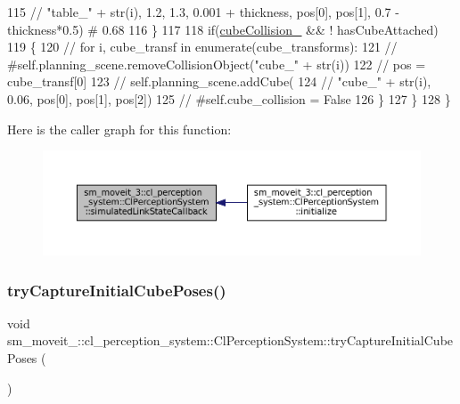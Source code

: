 \begin{DoxyCode}
115         \textcolor{comment}{//                 "table\_" + str(i), 1.2, 1.3, 0.001 + thickness, pos[0],  pos[1],  0.7 - 
       thickness*0.5)  # 0.68}
116         \}
117 
118         \textcolor{keywordflow}{if}(\hyperlink{classsm__moveit__3_1_1cl__perception__system_1_1ClPerceptionSystem_a939dd657fa6c5e05ee171b2ec7daad1f}{cubeCollision\_} && ! hasCubeAttached)
119         \{
120         \textcolor{comment}{//         for i, cube\_transf in enumerate(cube\_transforms):}
121         \textcolor{comment}{//             #self.planning\_scene.removeCollisionObject("cube\_" + str(i))}
122         \textcolor{comment}{//             pos = cube\_transf[0]}
123         \textcolor{comment}{//             self.planning\_scene.addCube(}
124         \textcolor{comment}{//                 "cube\_" + str(i), 0.06, pos[0],  pos[1],  pos[2])}
125         \textcolor{comment}{//             #self.cube\_collision = False}
126         \}
127       \}
128   \}
\end{DoxyCode}
Here is the caller graph for this function\+:
\nopagebreak
\begin{figure}[H]
\begin{center}
\leavevmode
\includegraphics[width=350pt]{classsm__moveit__3_1_1cl__perception__system_1_1ClPerceptionSystem_a540c3a50c29e6ec58f6fcd7e993d9dff_icgraph}
\end{center}
\end{figure}
\mbox{\label{classsm__moveit__3_1_1cl__perception__system_1_1ClPerceptionSystem_a211e752ccac5163bc775fa426c0d188d}} 
\subsubsection{\texorpdfstring{try\+Capture\+Initial\+Cube\+Poses()}{tryCaptureInitialCubePoses()}}
{\footnotesize\ttfamily void sm\+\_\+moveit\+\_\+::cl\+\_\+perception\+\_\+system\+::\+Cl\+Perception\+System\+::try\+Capture\+Initial\+Cube\+Poses (\begin{DoxyParamCaption}{ }\end{DoxyParamCaption})\hspace{0.3cm}{\ttfamily [inline]}}



